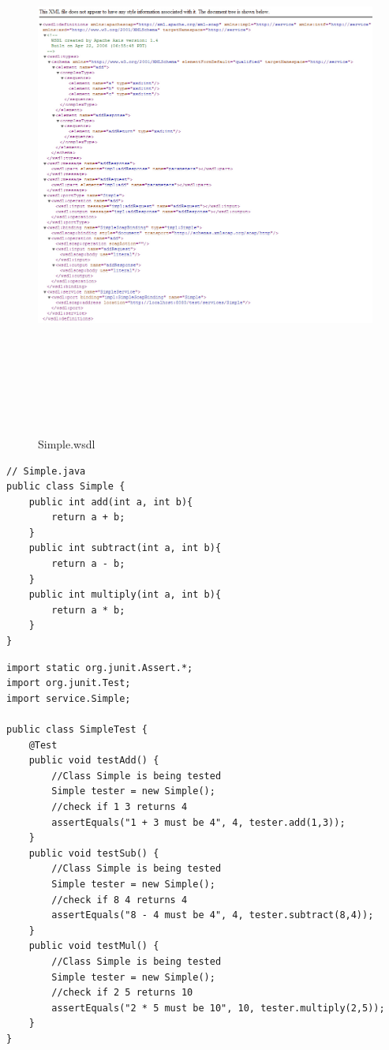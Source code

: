 \documentclass[12pt]{article}
\begin{document}
\begin{figure}[ht!]
\centering
\includegraphics[width=18cm,height=18cm,keepaspectratio]{img/wsdl.jpg}
\caption{Simple.wsdl}
\label{overflow}
\end{figure}

\newpage


\begin{lstlisting}
// Simple.java
public class Simple {
	public int add(int a, int b){
		return a + b;
	}
	public int subtract(int a, int b){
		return a - b;
	}
	public int multiply(int a, int b){
		return a * b;
	}
}
\end{lstlisting}

\newpage
{}

\begin{lstlisting}
import static org.junit.Assert.*;
import org.junit.Test;
import service.Simple;

public class SimpleTest {
	@Test
	public void testAdd() {
		//Class Simple is being tested
		Simple tester = new Simple();
		//check if 1 3 returns 4
		assertEquals("1 + 3 must be 4", 4, tester.add(1,3));
	}
	public void testSub() {
		//Class Simple is being tested
		Simple tester = new Simple();
		//check if 8 4 returns 4
		assertEquals("8 - 4 must be 4", 4, tester.subtract(8,4));
	}
	public void testMul() {
		//Class Simple is being tested
		Simple tester = new Simple();
		//check if 2 5 returns 10
		assertEquals("2 * 5 must be 10", 10, tester.multiply(2,5));
	}
}
\end{lstlisting}

\newpage
\end{document}
